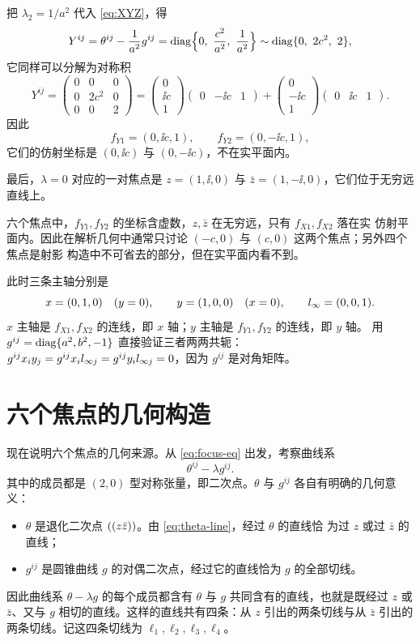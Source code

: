 把 $\lambda_2=1/a^2$ 代入 \eqref{eq:XYZ}，得
\[
Y^{ij}=\theta^{ij}-\frac{1}{a^2}g^{ij}
=\operatorname{diag}\Bigl\{0,\ \frac{c^2}{a^2},\ \frac{1}{a^2}\Bigr\}
\sim\operatorname{diag}\{0,\ 2c^2,\ 2\},
\]
它同样可以分解为对称积
\begin{equation}
Y^{ij}=
\begin{pmatrix}
0&0&0\\
0&2c^2&0\\
0&0&2
\end{pmatrix}
=
\begin{pmatrix}
0\\ \ii c\\1
\end{pmatrix}
\begin{pmatrix}
0&-\ii c&1
\end{pmatrix}
+
\begin{pmatrix}
0\\ -\ii c\\1
\end{pmatrix}
\begin{pmatrix}
0&\ii c&1
\end{pmatrix}.
\label{eq:ellipse-Y}
\end{equation}
因此
\[
f_{Y1}=(0,\ii c,1),\qquad f_{Y2}=(0,-\ii c,1),
\]
它们的仿射坐标是 $(0,\ii c)$ 与 $(0,-\ii c)$，不在实平面内。

最后，$\lambda=0$ 对应的一对焦点是 $z=(1,\ii,0)$ 与 $\bar z=(1,-\ii,0)$，它们位于无穷远
直线上。

\begin{remark}[解析几何中可见的焦点]
六个焦点中，$f_{Y1},f_{Y2}$ 的坐标含虚数，$z,\bar z$ 在无穷远，只有 $f_{X1},f_{X2}$ 落在实
仿射平面内。因此在解析几何中通常只讨论 $(-c,0)$ 与 $(c,0)$ 这两个焦点；另外四个焦点是射影
构造中不可省去的部分，但在实平面内看不到。
\end{remark}

此时三条主轴分别是
\[
x=(0,1,0)\quad(y=0),\qquad
y=(1,0,0)\quad(x=0),\qquad
l_{\infty}=(0,0,1).
\]
$x$ 主轴是 $f_{X1},f_{X2}$ 的连线，即 $x$ 轴；$y$ 主轴是 $f_{Y1},f_{Y2}$ 的连线，即 $y$ 轴。
用 $g^{ij}=\operatorname{diag}\{a^2,b^2,-1\}$ 直接验证三者两两共轭：
$g^{ij}x_iy_j=g^{ij}x_il_{\infty j}=g^{ij}y_il_{\infty j}=0$，因为 $g^{ij}$ 是对角矩阵。

\section{六个焦点的几何构造}

现在说明六个焦点的几何来源。从 \eqref{eq:focus-eq} 出发，考察曲线系
\[
\theta^{ij}-\lambda g^{ij}.
\]
其中的成员都是 $(2,0)$ 型对称张量，即二次点。$\theta$ 与 $g^{ij}$ 各自有明确的几何意义：
\begin{itemize}
\item $\theta$ 是退化二次点 $((z\bar z))$。由 \eqref{eq:theta-line}，经过 $\theta$ 的直线恰
为过 $z$ 或过 $\bar z$ 的直线；
\item $g^{ij}$ 是圆锥曲线 $g$ 的对偶二次点，经过它的直线恰为 $g$ 的全部切线。
\end{itemize}
因此曲线系 $\theta-\lambda g$ 的每个成员都含有 $\theta$ 与 $g$ 共同含有的直线，也就是既经过
$z$ 或 $\bar z$、又与 $g$ 相切的直线。这样的直线共有四条：从 $z$ 引出的两条切线与从 $\bar z$
引出的两条切线。记这四条切线为 $\ell_1,\ell_2,\ell_3,\ell_4$。

